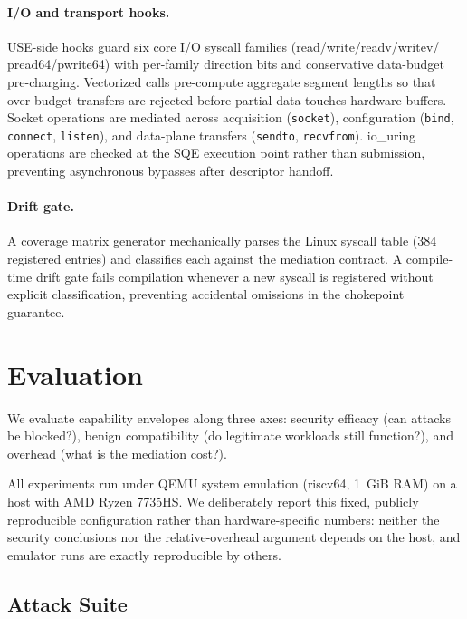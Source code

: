 \documentclass[letterpaper,twocolumn,10pt]{article}
\begin{document}
\paragraph{I/O and transport hooks.}
USE-side hooks guard six core I/O syscall families (read/write/readv/writev/
pread64/pwrite64) with per-family direction bits and conservative data-budget
pre-charging.  Vectorized calls pre-compute aggregate segment lengths so that
over-budget transfers are rejected before partial data touches hardware buffers.
Socket operations are mediated across acquisition (\texttt{socket}),
configuration (\texttt{bind}, \texttt{connect}, \texttt{listen}), and
data-plane transfers (\texttt{sendto}, \texttt{recvfrom}).  io\_uring
operations are checked at the SQE execution point rather than submission,
preventing asynchronous bypasses after descriptor handoff.

\paragraph{Drift gate.}
A coverage matrix generator mechanically parses the Linux syscall table
(384 registered entries) and classifies each against the mediation contract.
A compile-time drift gate fails compilation whenever a new syscall is
registered without explicit classification, preventing accidental omissions
in the chokepoint guarantee.

\section{Evaluation}
\label{sec:eval}

We evaluate capability envelopes along three axes: security efficacy
(can attacks be blocked?), benign compatibility (do legitimate
workloads still function?), and overhead (what is the mediation cost?).

All experiments run under QEMU system emulation (riscv64, 1~GiB RAM)
on a host with AMD Ryzen 7735HS.  We deliberately report this fixed,
publicly reproducible configuration rather than hardware-specific
numbers: neither the security conclusions nor the relative-overhead
argument depends on the host, and emulator runs are exactly
reproducible by others.

\subsection{Attack Suite}
\end{document}

